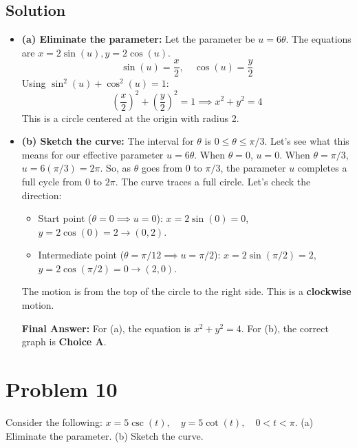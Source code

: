 \documentclass{article}
\begin{document}
\subsection*{Solution}
\begin{itemize}
    \item \textbf{(a) Eliminate the parameter:}
    Let the parameter be $u = 6\theta$. The equations are $x = 2 \sin(u), y = 2 \cos(u)$.
    \[ \sin(u) = \frac{x}{2}, \quad \cos(u) = \frac{y}{2} \]
    Using $\sin^2(u) + \cos^2(u) = 1$:
    \[ \left(\frac{x}{2}\right)^2 + \left(\frac{y}{2}\right)^2 = 1 \implies x^2 + y^2 = 4 \]
    This is a circle centered at the origin with radius 2.

    \item \textbf{(b) Sketch the curve:}
    The interval for $\theta$ is $0 \le \theta \le \pi/3$. Let's see what this means for our effective parameter $u = 6\theta$.
    When $\theta=0$, $u=0$. When $\theta=\pi/3$, $u = 6(\pi/3) = 2\pi$.
    So, as $\theta$ goes from 0 to $\pi/3$, the parameter $u$ completes a full cycle from 0 to $2\pi$. The curve traces a full circle.
    Let's check the direction:
    \begin{itemize}
        \item Start point ($\theta=0 \implies u=0$): $x=2\sin(0)=0$, $y=2\cos(0)=2 \rightarrow (0, 2)$.
        \item Intermediate point ($\theta=\pi/12 \implies u=\pi/2$): $x=2\sin(\pi/2)=2$, $y=2\cos(\pi/2)=0 \rightarrow (2, 0)$.
    \end{itemize}
    The motion is from the top of the circle to the right side. This is a \textbf{clockwise} motion.

    \textbf{Final Answer:} For (a), the equation is $x^2 + y^2 = 4$. For (b), the correct graph is \textbf{Choice A}.
\end{itemize}

\section{Problem 10}
Consider the following: $x = 5 \csc(t), \quad y = 5 \cot(t), \quad 0 < t < \pi$.
(a) Eliminate the parameter.
(b) Sketch the curve.
\end{document}
